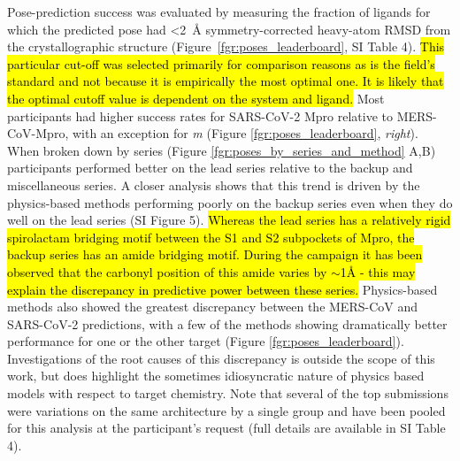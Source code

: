 \documentclass[journal=jcim,manuscript=article]{achemso}
\begin{document}
Pose-prediction success was evaluated by measuring the fraction of ligands for which the predicted pose had \textless 2~Å symmetry-corrected heavy-atom RMSD from the crystallographic structure (Figure~\ref{fgr:poses_leaderboard}, SI Table 4). \hl{This particular cut-off was selected primarily for comparison reasons as is the field's standard and not because it is empirically the most optimal one. It is likely that the optimal cutoff value is dependent on the system and ligand.}\cite{payne_2025, skrinjar_cofold_mem_2025} Most participants had higher success rates for SARS-CoV-2 Mpro relative to MERS-CoV-Mpro, with an exception for \textit{m} (Figure \ref{fgr:poses_leaderboard}, \emph{right}). When broken down by series (Figure \ref{fgr:poses_by_series_and_method} A,B) participants performed better on the lead series relative to the backup and miscellaneous series. A closer analysis shows that this trend is driven by the physics-based methods performing poorly on the backup series even when they do well on the lead series (SI Figure 5). \hl{Whereas the lead series has a relatively rigid spirolactam bridging motif between the S1 and S2 subpockets of Mpro, the backup series has an amide bridging motif. During the campaign it has been observed that the carbonyl position of this amide varies by $\sim$1Å - this may explain the discrepancy in predictive power between these series.} Physics-based methods also showed the greatest discrepancy between the MERS-CoV and SARS-CoV-2 predictions, with a few of the methods showing dramatically better performance for one or the other target (Figure \ref{fgr:poses_leaderboard}). Investigations of the root causes of this discrepancy is outside the scope of this work, but does highlight the sometimes idiosyncratic nature of physics based models with respect to target chemistry\cite{ross_maximal_2023}. Note that several of the top submissions were variations on the same architecture by a single group and have been pooled for this analysis at the participant's request (full details are available in SI Table 4).
\end{document}
